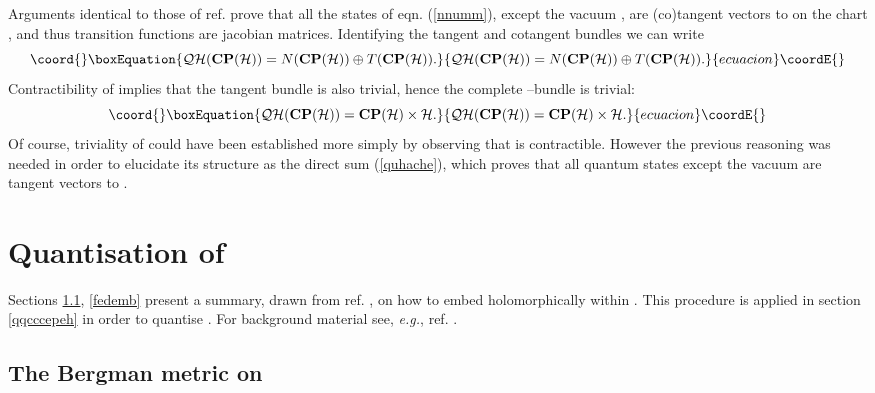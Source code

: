 \documentclass[a4paper,a4paper]{article}
\begin{document}
Arguments identical to those of ref. \cite{PQM} prove that all the states of eqn. (\ref{nnumm}), 
except the vacuum \myHighlight{$\vert 0\rangle$}\coordHE{}, are (co)tangent vectors to \coordHE{} on the 
chart \coordHE{}, and thus transition functions are jacobian matrices. 
Identifying the tangent and cotangent bundles we can write
\begin{equation}\coord{}\boxEquation{
{\cal QH}({\bf CP}({\cal H})) = N({\bf CP}({\cal H})) \oplus T({\bf CP}({\cal H})).
\label{quhache}
}{
{\cal QH}({\bf CP}({\cal H})) = N({\bf CP}({\cal H})) \oplus T({\bf CP}({\cal H})).
}{ecuacion}\coordE{}\end{equation}
Contractibility of \coordHE{} implies that the tangent bundle 
\coordHE{} is also trivial, hence the complete \coordHE{}--bundle is trivial:
\begin{equation}\coord{}\boxEquation{
{\cal QH}({\bf CP}({\cal H})) = {\bf CP}({\cal H})\times {\cal H}.
\label{tuttr}
}{
{\cal QH}({\bf CP}({\cal H})) = {\bf CP}({\cal H})\times {\cal H}.
}{ecuacion}\coordE{}\end{equation}
Of course, triviality of \coordHE{} could have been established 
more simply by observing that \coordHE{} is contractible. However the previous 
reasoning was needed in order to elucidate its structure as the direct sum (\ref{quhache}), 
which proves that all quantum states except the vacuum are tangent vectors to \coordHE{}.


\section{Quantisation of \coordHE{}}\label{imbbdd}


Sections \ref{bemet}, \ref{fedemb} present a summary, drawn from ref. \cite{CPINF}, 
on how to embed \coordHE{} holomorphically within \coordHE{}. 
This procedure is applied in section \ref{qqcccepeh} in order to quantise \coordHE{}.
For background material see, {\it e.g.}, ref. \cite{PERELOMOV}.


\subsection{The Bergman metric on \coordHE{}}\label{bemet}
\end{document}
